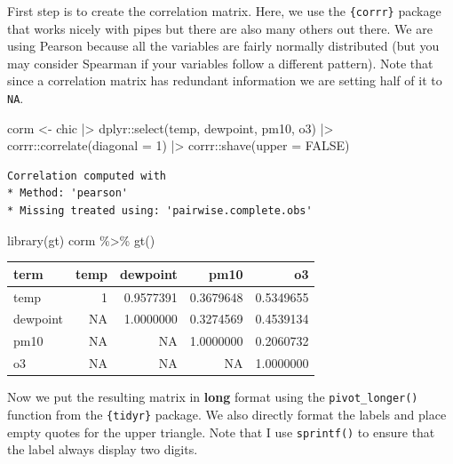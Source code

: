 \documentclass[
  letterpaper,
]{scrbook}
\newenvironment{Shaded}{\begin{snugshade}}{\end{snugshade}}
\newcommand{\AttributeTok}[1]{\textcolor[rgb]{0.40,0.45,0.13}{#1}}
\newcommand{\ConstantTok}[1]{\textcolor[rgb]{0.56,0.35,0.01}{#1}}
\newcommand{\DecValTok}[1]{\textcolor[rgb]{0.68,0.00,0.00}{#1}}
\newcommand{\FunctionTok}[1]{\textcolor[rgb]{0.28,0.35,0.67}{#1}}
\newcommand{\NormalTok}[1]{\textcolor[rgb]{0.00,0.23,0.31}{#1}}
\newcommand{\OtherTok}[1]{\textcolor[rgb]{0.00,0.23,0.31}{#1}}
\newcommand{\SpecialCharTok}[1]{\textcolor[rgb]{0.37,0.37,0.37}{#1}}
\begin{document}
First step is to create the correlation matrix. Here, we use the
\texttt{\{corrr\}} package that works nicely with pipes but there are
also many others out there. We are using Pearson because all the
variables are fairly normally distributed (but you may consider Spearman
if your variables follow a different pattern). Note that since a
correlation matrix has redundant information we are setting half of it
to \texttt{NA}.

\begin{Shaded}
\begin{Highlighting}[]
\NormalTok{corm }\OtherTok{\textless{}{-}}
\NormalTok{  chic }\SpecialCharTok{|\textgreater{}}
\NormalTok{  dplyr}\SpecialCharTok{::}\FunctionTok{select}\NormalTok{(temp, dewpoint, pm10, o3) }\SpecialCharTok{|\textgreater{}}
\NormalTok{  corrr}\SpecialCharTok{::}\FunctionTok{correlate}\NormalTok{(}\AttributeTok{diagonal =} \DecValTok{1}\NormalTok{) }\SpecialCharTok{|\textgreater{}}
\NormalTok{  corrr}\SpecialCharTok{::}\FunctionTok{shave}\NormalTok{(}\AttributeTok{upper =} \ConstantTok{FALSE}\NormalTok{)}
\end{Highlighting}
\end{Shaded}

\begin{verbatim}
Correlation computed with
* Method: 'pearson'
* Missing treated using: 'pairwise.complete.obs'
\end{verbatim}

\begin{Shaded}
\begin{Highlighting}[]
\FunctionTok{library}\NormalTok{(gt)}
\NormalTok{corm }\SpecialCharTok{\%\textgreater{}\%} \FunctionTok{gt}\NormalTok{()}
\end{Highlighting}
\end{Shaded}

\begin{longtable*}{lrrrr}
\toprule
term & temp & dewpoint & pm10 & o3 \\ 
\midrule\addlinespace[2.5pt]
temp & 1 & 0.9577391 & 0.3679648 & 0.5349655 \\ 
dewpoint & NA & 1.0000000 & 0.3274569 & 0.4539134 \\ 
pm10 & NA & NA & 1.0000000 & 0.2060732 \\ 
o3 & NA & NA & NA & 1.0000000 \\ 
\bottomrule
\end{longtable*}

Now we put the resulting matrix in \textbf{long} format using the
\texttt{pivot\_longer()} function from the \texttt{\{tidyr\}} package.
We also directly format the labels and place empty quotes for the upper
triangle. Note that I use \texttt{sprintf()} to ensure that the label
always display two digits.
\end{document}

